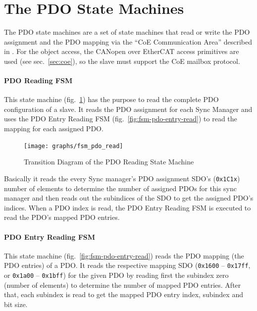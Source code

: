 \documentclass[a4paper,12pt,BCOR6mm,bibtotoc,idxtotoc]{scrbook}
\begin{document}

\section{The PDO State Machines}
\label{sec:fsm-pdo}

The PDO state machines are a set of state machines that read or write the PDO
assignment and the PDO mapping via the ``CoE Communication Area'' described in
\cite[sec. 5.6.7.4]{alspec}. For the object access, the CANopen over EtherCAT
access primitives are used (see sec.~\ref{sec:coe}), so the slave must support
the CoE mailbox protocol.

\paragraph{PDO Reading FSM} This state machine (fig.~\ref{fig:fsm-pdo-read})
has the purpose to read the complete PDO configuration of a slave. It reads
the PDO assignment for each Sync Manager and uses the PDO Entry Reading FSM
(fig.~\ref{fig:fsm-pdo-entry-read}) to read the mapping for each assigned PDO.

\begin{figure}[htbp]
  \centering
  \texttt{[image: graphs/fsm\_pdo\_read]}
  \caption{Transition Diagram of the PDO Reading State Machine}
  \label{fig:fsm-pdo-read}
\end{figure}

Basically it reads the every Sync manager's PDO assignment SDO's
(\lstinline+0x1C1x+) number of elements to determine the number of assigned
PDOs for this sync manager and then reads out the subindices of the SDO to get
the assigned PDO's indices. When a PDO index is read, the PDO Entry Reading
FSM is executed to read the PDO's mapped PDO entries.

\paragraph{PDO Entry Reading FSM} This state machine
(fig.~\ref{fig:fsm-pdo-entry-read}) reads the PDO mapping (the PDO entries) of
a PDO. It reads the respective mapping SDO (\lstinline+0x1600+ --
\lstinline+0x17ff+, or \lstinline+0x1a00+ -- \lstinline+0x1bff+) for the given
PDO by reading first the subindex zero (number of elements) to determine the
number of mapped PDO entries. After that, each subindex is read to get the
mapped PDO entry index, subindex and bit size.
\end{document}
